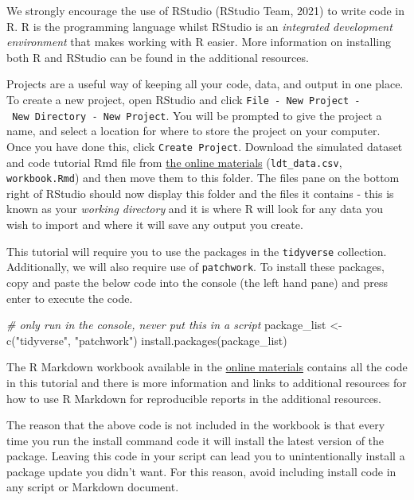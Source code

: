 \documentclass[
  english,
  doc,floatsintext]{apa6}
\newenvironment{Shaded}{\begin{snugshade}}{\end{snugshade}}
\newcommand{\CommentTok}[1]{\textcolor[rgb]{0.56,0.35,0.01}{\textit{#1}}}
\newcommand{\FunctionTok}[1]{\textcolor[rgb]{0.00,0.00,0.00}{#1}}
\newcommand{\NormalTok}[1]{#1}
\newcommand{\OtherTok}[1]{\textcolor[rgb]{0.56,0.35,0.01}{#1}}
\newcommand{\StringTok}[1]{\textcolor[rgb]{0.31,0.60,0.02}{#1}}
\begin{document}
We strongly encourage the use of RStudio (RStudio Team, 2021) to write code in R. R is the programming language whilst RStudio is an \emph{integrated development environment} that makes working with R easier. More information on installing both R and RStudio can be found in the additional resources.

Projects are a useful way of keeping all your code, data, and output in one place. To create a new project, open RStudio and click \texttt{File\ -\ New\ Project\ -\ New\ Directory\ -\ New\ Project}. You will be prompted to give the project a name, and select a location for where to store the project on your computer. Once you have done this, click \texttt{Create\ Project}. Download the simulated dataset and code tutorial Rmd file from \href{https://osf.io/bj83f/files/}{the online materials} (\texttt{ldt\_data.csv}, \texttt{workbook.Rmd}) and then move them to this folder. The files pane on the bottom right of RStudio should now display this folder and the files it contains - this is known as your \emph{working directory} and it is where R will look for any data you wish to import and where it will save any output you create.

This tutorial will require you to use the packages in the \texttt{tidyverse} collection. Additionally, we will also require use of \texttt{patchwork}. To install these packages, copy and paste the below code into the console (the left hand pane) and press enter to execute the code.

\begin{Shaded}
\begin{Highlighting}[]
\CommentTok{\# only run in the console, never put this in a script }
\NormalTok{package\_list }\OtherTok{\textless{}{-}} \FunctionTok{c}\NormalTok{(}\StringTok{"tidyverse"}\NormalTok{, }\StringTok{"patchwork"}\NormalTok{)}
\FunctionTok{install.packages}\NormalTok{(package\_list)}
\end{Highlighting}
\end{Shaded}

The R Markdown workbook available in the \href{https://osf.io/bj83f/files/}{online materials} contains all the code in this tutorial and there is more information and links to additional resources for how to use R Markdown for reproducible reports in the additional resources.

The reason that the above code is not included in the workbook is that every time you run the install command code it will install the latest version of the package. Leaving this code in your script can lead you to unintentionally install a package update you didn't want. For this reason, avoid including install code in any script or Markdown document.
\end{document}
